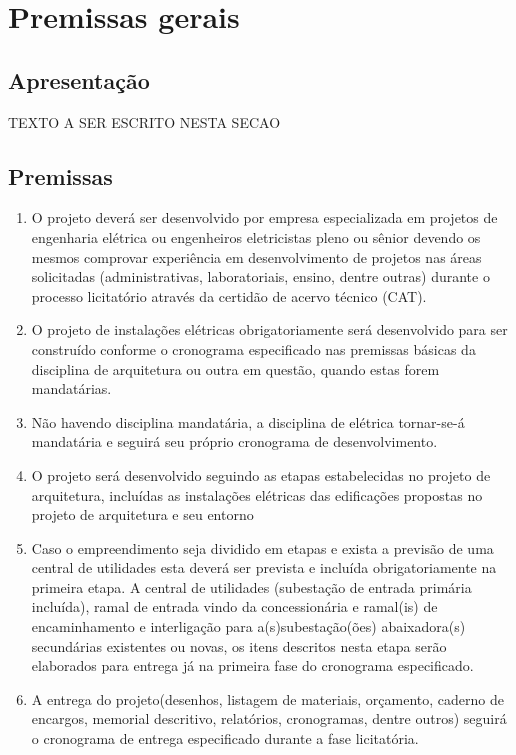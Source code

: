 \section{Premissas gerais} \label{section: general settings}
\subsection{Apresentação}
TEXTO A SER ESCRITO NESTA SECAO

\subsection{Premissas}
\begin{enumerate}
	\item O projeto deverá ser desenvolvido por empresa especializada em projetos de engenharia elétrica ou engenheiros eletricistas pleno ou sênior devendo os mesmos comprovar experiência em desenvolvimento de projetos nas áreas solicitadas (administrativas, laboratoriais, ensino, dentre outras) durante o processo licitatório através da certidão de acervo técnico (CAT).
	
	\item O projeto de instalações elétricas obrigatoriamente será desenvolvido para ser construído conforme o cronograma especificado nas premissas básicas da disciplina de arquitetura ou outra em questão, quando estas forem mandatárias.
	
	\item Não havendo disciplina mandatária, a disciplina de elétrica tornar-se-á mandatária e seguirá seu próprio cronograma de desenvolvimento.
	
	\item O projeto será desenvolvido seguindo as etapas estabelecidas no projeto de arquitetura, incluídas as instalações elétricas das edificações propostas no projeto de arquitetura e seu entorno
	
	\item Caso o empreendimento seja dividido em etapas e exista a previsão de uma central de utilidades esta deverá ser prevista e incluída obrigatoriamente na primeira etapa. A central de utilidades (subestação de entrada primária incluída), ramal de entrada vindo da concessionária e ramal(is) de encaminhamento e interligação para a(s)subestação(ões) abaixadora(s) secundárias existentes ou novas, os itens descritos nesta etapa serão elaborados para entrega já na primeira fase do cronograma especificado.
	
	\item A entrega do projeto(desenhos, listagem de materiais, orçamento, caderno de encargos, memorial descritivo, relatórios, cronogramas, dentre outros) seguirá o cronograma de entrega especificado durante a fase licitatória.
	

\end{enumerate}
